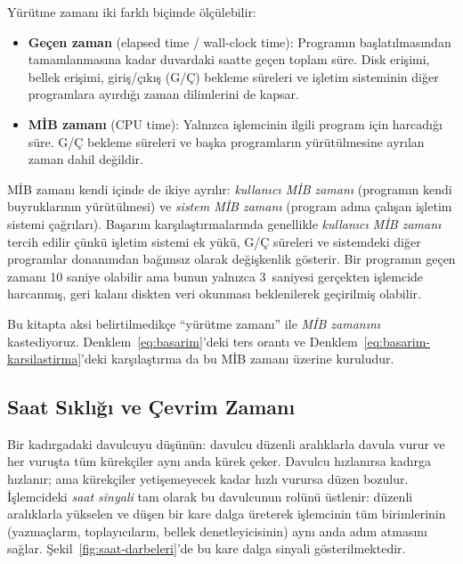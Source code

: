 Yürütme zamanı iki farklı biçimde ölçülebilir:

\begin{itemize}
    \item \textbf{Geçen zaman} (elapsed time / wall-clock time): Programın başlatılmasından tamamlanmasına kadar duvardaki saatte geçen toplam süre. Disk erişimi, bellek erişimi, giriş/çıkış (G/Ç) bekleme süreleri ve işletim sisteminin diğer programlara ayırdığı zaman dilimlerini de kapsar.
    \item \textbf{MİB zamanı} (CPU time): Yalnızca işlemcinin ilgili program için harcadığı süre. G/Ç bekleme süreleri ve başka programların yürütülmesine ayrılan zaman dahil değildir.
\end{itemize}

MİB zamanı kendi içinde de ikiye ayrılır: \emph{kullanıcı MİB zamanı} (programın kendi buyruklarının yürütülmesi) ve \emph{sistem MİB zamanı} (program adına çalışan işletim sistemi çağrıları). Başarım karşılaştırmalarında genellikle \emph{kullanıcı MİB zamanı} tercih edilir çünkü işletim sistemi ek yükü, G/Ç süreleri ve sistemdeki diğer programlar donanımdan bağımsız olarak değişkenlik gösterir. Bir programın geçen zamanı 10 saniye olabilir ama bunun yalnızca 3~saniyesi gerçekten işlemcide harcanmış, geri kalanı diskten veri okunması beklenilerek geçirilmiş olabilir.

\noindent Bu kitapta aksi belirtilmedikçe ``yürütme zamanı'' ile \emph{MİB zamanını} kastediyoruz. Denklem~\ref{eq:basarim}'deki ters orantı ve Denklem~\ref{eq:basarim-karsilastirma}'deki karşılaştırma da bu MİB zamanı üzerine kuruludur.

\subsection{Saat Sıklığı ve Çevrim Zamanı}
\label{subsec:saat-sikligi}

Bir kadırgadaki davulcuyu düşünün: davulcu düzenli aralıklarla davula vurur ve her vuruşta tüm kürekçiler aynı anda kürek çeker. Davulcu hızlanırsa kadırga hızlanır; ama kürekçiler yetişemeyecek kadar hızlı vurursa düzen bozulur. İşlemcideki \emph{saat sinyali} tam olarak bu davulcunun rolünü üstlenir: düzenli aralıklarla yükselen ve düşen bir kare dalga üreterek işlemcinin tüm birimlerinin (yazmaçların, toplayıcıların, bellek denetleyicisinin) aynı anda adım atmasını sağlar. Şekil~\ref{fig:saat-darbeleri}'de bu kare dalga sinyali gösterilmektedir.

